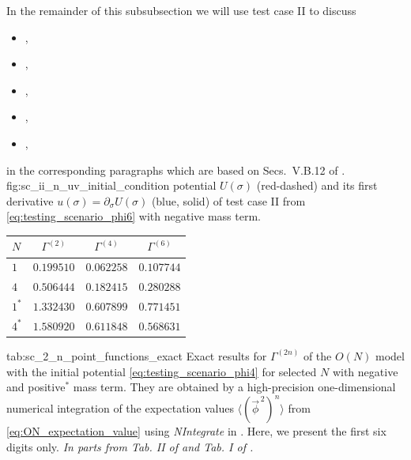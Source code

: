 In the remainder of this subsubsection we will use test case II to discuss
\begin{itemize}
	\item {},
	\item {},
	\item {},
	\item {},
	\item {},
\end{itemize}
in the corresponding paragraphs which are based on Secs.~V.B.1\dash{}2 of .
	{fig:sc_ii_n_uv_initial_condition} %
	{%
		\uv{} potential $U ( \sigma )$ (red-dashed) and its first derivative $u ( \sigma ) = \partial_\sigma U ( \sigma )$ (blue, solid) of test case II from \cref{eq:testing_scenario_phi6} with negative mass term. 
	} %
	{%
		\renewcommand{\arraystretch}{1.15}
		\small
		\begin{tabular}{l c c c}
			\toprule
			$N$		&	$\Gamma^{(2)}$	&	$\Gamma^{(4)}$	&	$\Gamma^{(6)}$	\\
			\midrule
				$1$	&	$0.199510$	&	$0.062258$	&	$0.107744$\\
				$4$	&	$0.506444$	&	$0.182415$	&	$0.280288$\\
				\hline
				$1^{*}$	&	$1.332430$	&	$0.607899$	&	$0.771451$\\
				$4^{*}$	&	$1.580920$	&	$0.611848$	&	$0.568631$\\
			\bottomrule
		\end{tabular}
	} %
	{tab:sc_2_n_point_functions_exact}%
	{%
		Exact results for $\Gamma^{(2n)}$ of the $O(N)$ model with the \uv{} initial potential \eqref{eq:testing_scenario_phi4} for selected $N$  with negative and positive${}^{*}$ mass term.
		They are obtained by a high-precision one-dimensional numerical integration of the expectation values $\langle ( \vec{\phi}^{\, 2} )^n \rangle$ from \cref{eq:ON_expectation_value} using \textit{NIntegrate} in \WAMXIIwR{}.
		Here, we present the first six digits only.
		\textit{In parts from Tab. II of  and Tab. I of .}%
	} %
\FloatBarrier
